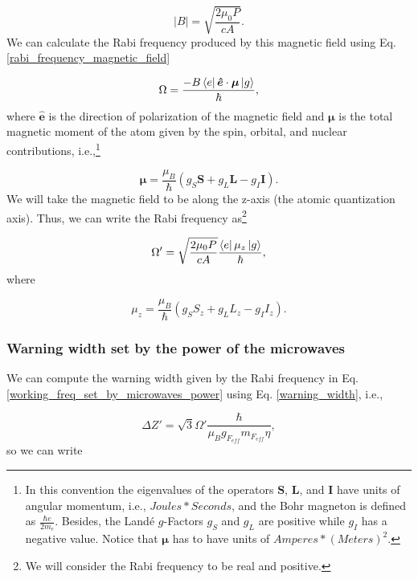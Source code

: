 \documentclass{article}
\begin{document}
\begin{equation}
    |B| = \sqrt{\frac{2 \mu_{0} P}{c A}}.
\end{equation}
%
We can calculate the Rabi frequency produced by this magnetic field using Eq. \ref{rabi_frequency_magnetic_field}

\begin{equation*}
\Omega = \frac{- B \bra{e} \boldsymbol{\hat{e}} \cdot \boldsymbol{\mu} \ket{g}}{\hbar},
\end{equation*}
%
where $\boldsymbol{\hat{e}}$ is the direction of polarization of the magnetic field and $\boldsymbol{\mu}$ is the total magnetic moment of the atom given by the spin, orbital, and nuclear contributions, i.e.,\footnote{In this convention the eigenvalues of the operators $\boldsymbol{S}$, $\boldsymbol{L}$, and $\boldsymbol{I}$ have units of angular momentum, i.e., $Joules*Seconds$, and the Bohr magneton is defined as $\frac{\hbar e}{2 m_{e}}$. Besides, the Landé $g$-Factors $g_{S}$ and $g_{L}$ are positive while $g_{I}$ has a negative value. Notice that $\boldsymbol{\mu}$ has to have units of $Amperes*(Meters)^2$.}

\begin{equation}
     \boldsymbol{\mu} = \frac{\mu_{B}}{\hbar}(g_{S}\boldsymbol{S} + g_{L}\boldsymbol{L} - g_{I}\boldsymbol{I}).
\end{equation}
%
We will take the magnetic field to be along the z-axis (the atomic quantization axis). Thus, we can write the Rabi frequency as\footnote{We will consider the Rabi frequency to be real and positive.}

\begin{equation}\label{working_freq_set_by_microwaves_power}
\Omega' = \sqrt{\frac{2 \mu_{0} P}{c A}} \frac{\bra{e} \mu_{z} \ket{g}}{\hbar},
\end{equation}
%
where 

\begin{equation}
     \mu_{z} = \frac{\mu_{B}}{\hbar}(g_{S}S_{z} + g_{L}L_{z} - g_{I}I_{z}).
\end{equation}

\subsubsection{Warning width set by the power of the microwaves}
We can compute the warning width given by the Rabi frequency in Eq. \ref{working_freq_set_by_microwaves_power} using Eq. \ref{warning_width}, i.e.,

\begin{equation*}
\Delta Z' = \sqrt{3} \Omega' \frac{\hbar}{\mu_{B} g_{F_{eff}} m_{F_{eff}} \eta},
\end{equation*}
%
so we can write
\end{document}
